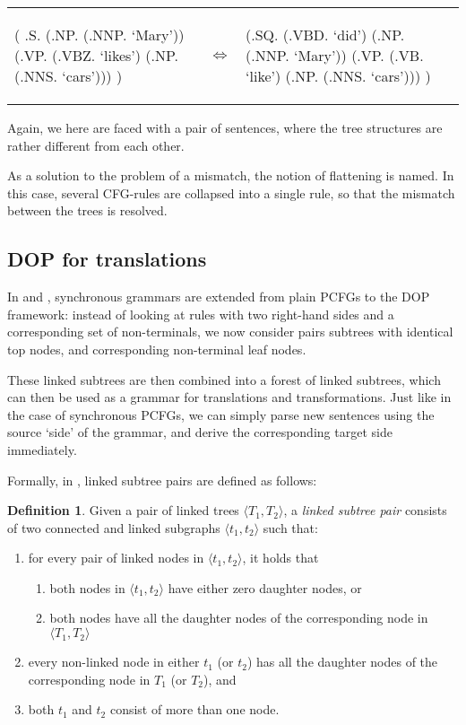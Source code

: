 \documentclass[a4paper]{article}
\theoremstyle{definition}
\newtheorem{definition}[theorem]{Definition}
\begin{document}
\begin{tabular}{lll}
\begin{parsetree}
( .S.
    (.NP. (.NNP. `Mary'))
    (.VP. (.VBZ. `likes')
      (.NP. (.NNS. `cars')))
)
\end{parsetree}
& $\iff$ &
\begin{parsetree}
  (.SQ. (.VBD. `did')
    (.NP. (.NNP. `Mary'))
    (.VP. (.VB. `like')
      (.NP. (.NNS. `cars')))
    )
\end{parsetree}
\end{tabular}

Again, we here are faced with a pair of sentences, where the tree structures are rather different from each other.

As a solution to the problem of a mismatch, the notion of flattening is named. In this case, several CFG-rules are collapsed into a single rule, so that the mismatch between the trees is resolved.

\subsection{DOP for translations}

In \cite{Po} and \cite{Po2}, synchronous grammars are extended from plain PCFGs to the DOP framework: instead of looking at rules with two right-hand sides and a corresponding set of non-terminals, we now consider pairs subtrees with identical top nodes, and corresponding non-terminal leaf nodes.

These linked subtrees are then combined into a forest of linked subtrees, which can then be used as a grammar for translations and transformations. Just like in the case of synchronous PCFGs, we can simply parse new sentences using the source `side' of the grammar, and derive the corresponding target side immediately.

Formally, in \cite{Po}, linked subtree pairs are defined as follows:

\begin{definition}
Given a pair of linked trees $\langle T_1, T_2 \rangle$, a \emph{linked subtree pair} consists of two connected and linked subgraphs $\langle t_1, t_2 \rangle$ such that:
\begin{enumerate}
\item for every pair of linked nodes in $\langle t_1, t_2 \rangle$, it holds that
\begin{enumerate}
\item both nodes in $\langle t_1, t_2 \rangle$ have either zero daughter nodes, or
\item both nodes have all the daughter nodes of the corresponding node in $\langle T_1, T_2 \rangle$
\end{enumerate}
\item every non-linked node in either $t_1$ (or $t_2$) has all the daughter nodes of the corresponding node in $T_1$ (or $T_2$), and
\item both $t_1$ and $t_2$ consist of more than one node.
\end{enumerate}
\end{definition}
\end{document}
